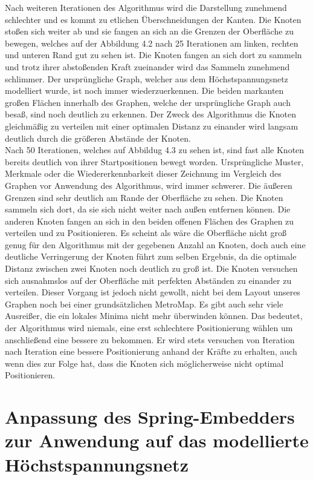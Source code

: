 Nach weiteren Iterationen des Algorithmus wird die Darstellung zunehmend schlechter und es kommt zu etlichen Überschneidungen der Kanten. Die Knoten stoßen sich weiter ab und sie fangen an sich an die Grenzen der Oberfläche zu bewegen, welches auf der Abbildung 4.2 nach 25 Iterationen am linken, rechten und unteren Rand gut zu sehen ist. Die Knoten fangen an sich dort zu sammeln und trotz ihrer abstoßenden Kraft zueinander wird das Sammeln zunehmend schlimmer. Der ursprüngliche Graph, welcher aus dem Höchstspannungsnetz modelliert wurde, ist noch immer wiederzuerkennen. Die beiden markanten großen Flächen innerhalb des Graphen, welche der ursprüngliche Graph auch besaß, sind noch deutlich zu erkennen. Der Zweck des Algorithmus die Knoten gleichmäßig zu verteilen mit einer optimalen Distanz zu einander wird langsam deutlich durch die größeren Abstände der Knoten. \\

Nach 50 Iterationen, welches auf Abbildug 4.3 zu sehen ist, sind fast alle Knoten bereits deutlich von ihrer Startpositionen bewegt worden. Ursprüngliche Muster, Merkmale oder die Wiedererkennbarkeit dieser Zeichnung im Vergleich des Graphen vor Anwendung des Algorithmus, wird immer schwerer. Die äußeren Grenzen sind sehr deutlich am Rande der Oberfläche zu sehen. Die Knoten sammeln sich dort, da sie sich nicht weiter nach außen entfernen können. Die anderen Knoten fangen an sich in den beiden offenen Flächen des Graphen zu verteilen und zu Positionieren. Es scheint als wäre die Oberfläche nicht groß genug für den Algorithmus mit der gegebenen Anzahl an Knoten, doch auch eine deutliche Verringerung der Knoten führt zum selben Ergebnis, da die optimale Distanz zwischen zwei Knoten noch deutlich zu groß ist. Die Knoten versuchen sich ausnahmslos auf der Oberfläche mit perfekten Abständen zu einander zu verteilen. Dieser Vorgang ist jedoch nicht gewollt, nicht bei dem Layout unseres Graphen noch bei einer grundsätzlichen MetroMap. Es gibt auch sehr viele Ausreißer, die ein lokales Minima nicht mehr überwinden können. Das bedeutet, der Algorithmus wird niemals, eine erst schlechtere Positionierung wählen um anschließend eine bessere zu bekommen. Er wird stets versuchen von Iteration nach Iteration eine bessere Positionierung anhand der Kräfte zu erhalten, auch wenn dies zur Folge hat, dass die Knoten sich möglicherweise nicht optimal Positionieren. \\


\section{Anpassung des Spring-Embedders zur Anwendung auf das modellierte Höchstspannungsnetz}
\label{Kapitel_4_-_Unterkapitel_3}

